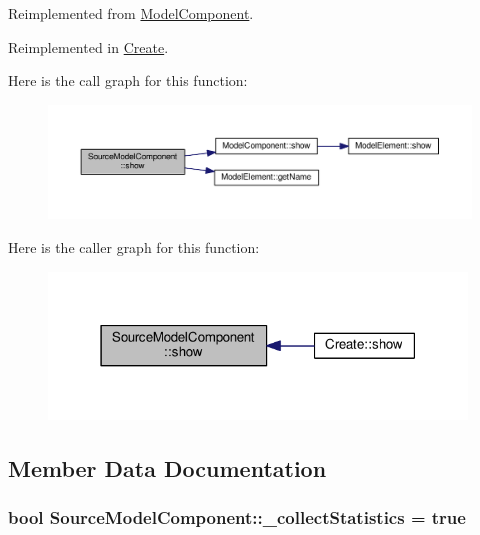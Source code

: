 Reimplemented from \hyperlink{class_model_component_ad8bc846e36b028eab7efb7da6c549eca}{Model\+Component}.



Reimplemented in \hyperlink{class_create_a8d1832d2165bbeea4a5a88aded883f86}{Create}.



Here is the call graph for this function\+:\nopagebreak
\begin{figure}[H]
\begin{center}
\leavevmode
\includegraphics[width=350pt]{class_source_model_component_a4011597b5780fcc0495e8e22ab8158f6_cgraph}
\end{center}
\end{figure}




Here is the caller graph for this function\+:\nopagebreak
\begin{figure}[H]
\begin{center}
\leavevmode
\includegraphics[width=315pt]{class_source_model_component_a4011597b5780fcc0495e8e22ab8158f6_icgraph}
\end{center}
\end{figure}




\subsection{Member Data Documentation}
\subsubsection[{\texorpdfstring{\+\_\+collect\+Statistics}{_collectStatistics}}]{\setlength{\rightskip}{0pt plus 5cm}bool Source\+Model\+Component\+::\+\_\+collect\+Statistics = true\hspace{0.3cm}{\ttfamily [protected]}}\hypertarget{class_source_model_component_ac0c009ff9a2e8169d251118dabcd19eb}{}\label{class_source_model_component_ac0c009ff9a2e8169d251118dabcd19eb}
